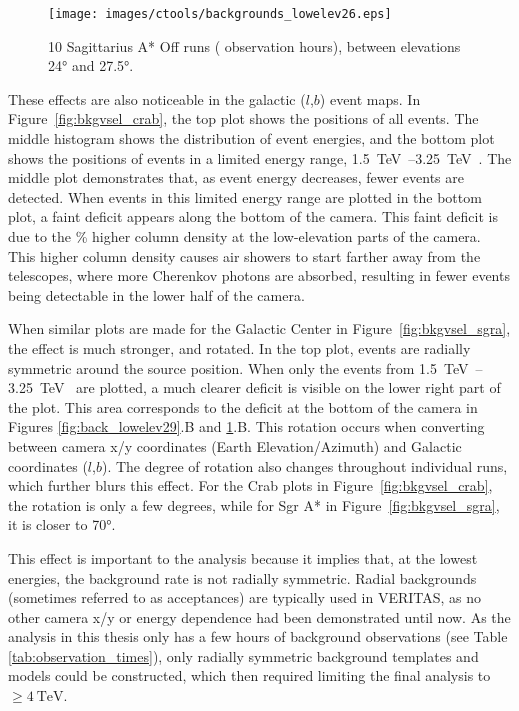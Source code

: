     \begin{figure}[!ht]
      \centering
      \texttt{[image: images/ctools/backgrounds\_lowelev26.eps]}
      \caption[CTOOLS Background at \ang{26} Elevation]{
        10 Sagittarius A* Off runs ( observation hours), between elevations \ang{24} and \ang{27.5}. 
      }
      \label{fig:back_lowelev26}
    \end{figure}
  
  These effects are also noticeable in the galactic ($l$,$b$) event maps.
  In Figure~\ref{fig:bkgvsel_crab}, the top plot shows the positions of all events.
  The middle histogram shows the distribution of event energies, and the bottom plot shows the positions of events in a limited energy range, \SIrange{1.5}{3.25}{\TeV{}}.
  The middle plot demonstrates that, as event energy decreases, fewer events are detected.
  When events in this limited energy range are plotted in the bottom plot, a faint deficit appears along the bottom of the camera.
  This faint deficit is due to the \% higher column density at the low-elevation parts of the camera.
  This higher column density causes air showers to start farther away from the telescopes, where more Cherenkov photons are absorbed, resulting in fewer events being detectable in the lower half of the camera.

  When similar plots are made for the Galactic Center in Figure~\ref{fig:bkgvsel_sgra}, the effect is much stronger, and rotated.
  In the top plot, events are radially symmetric around the source position.
  When only the events from \SIrange{1.5}{3.25}{\TeV{}} are plotted, a much clearer deficit is visible on the lower right part of the plot.
  This area corresponds to the deficit at the bottom of the camera in Figures \ref{fig:back_lowelev29}.B and \ref{fig:back_lowelev26}.B.
  This rotation occurs when converting between camera x/y coordinates (Earth Elevation/Azimuth) and Galactic coordinates ($l$,$b$).
  The degree of rotation also changes throughout individual runs, which further blurs this effect.
  For the Crab plots in Figure~\ref{fig:bkgvsel_crab}, the rotation is only a few degrees, while for Sgr A* in Figure~\ref{fig:bkgvsel_sgra}, it is closer to \ang{70}.
  
  This effect is important to the analysis because it implies that, at the lowest energies, the background rate is not radially symmetric.
  Radial backgrounds (sometimes referred to as acceptances) are typically used in VERITAS, as no other camera x/y or energy dependence had been demonstrated until now.
  As the analysis in this thesis only has a few hours of background observations (see Table \ref{tab:observation_times}), only radially symmetric background templates and models could be constructed, which then required limiting the final analysis to $\geq\SI{4}{\TeV{}}$.
  
